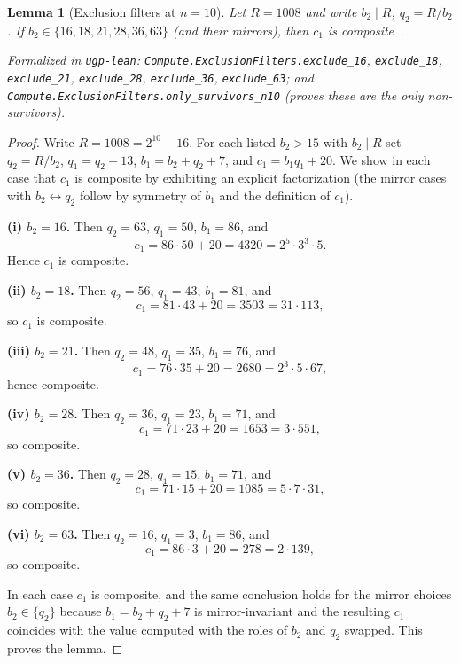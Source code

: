 \documentclass[12pt]{article}
\newtheorem{lemma}[theorem]{Lemma}
\numberwithin{equation}{section}
\begin{document}
\begin{lemma}[Exclusion filters at $n=10$]\label{lem:filters}
Let $R=1008$ and write $b_2\mid R$, $q_2=R/b_2$. If $b_2\in\{16,18,21,28,36,63\}$ (and their mirrors), then $c_1$ is composite~\cite{SpivackUGPFormalization,ugp-lean}.

\noindent\emph{Formalized in} \texttt{ugp-lean}: \texttt{Compute.ExclusionFilters.exclude\_16}, \texttt{exclude\_18}, \texttt{exclude\_21}, \texttt{exclude\_28}, \texttt{exclude\_36}, \texttt{exclude\_63}; and \texttt{Compute.ExclusionFilters.only\_survivors\_n10} (proves these are the \emph{only} non-survivors).
\end{lemma}
\begin{proof}
Write $R=1008=2^{10}-16$. For each listed $b_2>15$ with $b_2\mid R$ set $q_2=R/b_2$, $q_1=q_2-13$, $b_1=b_2+q_2+7$, and $c_1=b_1q_1+20$. We show in each case that $c_1$ is composite by exhibiting an explicit factorization (the mirror cases with $b_2\leftrightarrow q_2$ follow by symmetry of $b_1$ and the definition of $c_1$).

\smallskip
\noindent
\textbf{(i) $b_2=16$.} Then $q_2=63$, $q_1=50$, $b_1=86$, and
\[
c_1=86\cdot 50+20=4320=2^5\cdot 3^3\cdot 5.
\]
Hence $c_1$ is composite.

\smallskip
\noindent
\textbf{(ii) $b_2=18$.} Then $q_2=56$, $q_1=43$, $b_1=81$, and
\[
c_1=81\cdot 43+20=3503=31\cdot 113,
\]
so $c_1$ is composite.

\smallskip
\noindent
\textbf{(iii) $b_2=21$.} Then $q_2=48$, $q_1=35$, $b_1=76$, and
\[
c_1=76\cdot 35+20=2680=2^3\cdot 5\cdot 67,
\]
hence composite.

\smallskip
\noindent
\textbf{(iv) $b_2=28$.} Then $q_2=36$, $q_1=23$, $b_1=71$, and
\[
c_1=71\cdot 23+20=1653=3\cdot 551,
\]
so composite.

\smallskip
\noindent
\textbf{(v) $b_2=36$.} Then $q_2=28$, $q_1=15$, $b_1=71$, and
\[
c_1=71\cdot 15+20=1085=5\cdot 7\cdot 31,
\]
so composite.

\smallskip
\noindent
\textbf{(vi) $b_2=63$.} Then $q_2=16$, $q_1=3$, $b_1=86$, and
\[
c_1=86\cdot 3+20=278=2\cdot 139,
\]
so composite.

\smallskip
In each case $c_1$ is composite, and the same conclusion holds for the mirror choices $b_2\in\{q_2\}$ because $b_1=b_2+q_2+7$ is mirror-invariant and the resulting $c_1$ coincides with the value computed with the roles of $b_2$ and $q_2$ swapped. This proves the lemma.
\end{proof}
\end{document}
